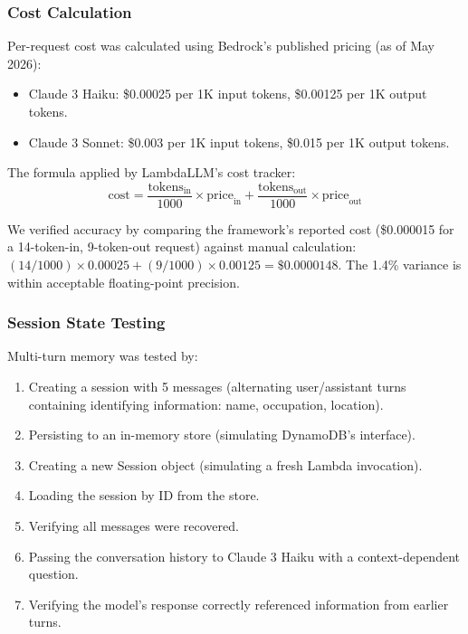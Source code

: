 \documentclass[10pt,twocolumn,letterpaper]{article}
\begin{document}
\subsubsection{Cost Calculation}

Per-request cost was calculated using Bedrock's published pricing (as of May 2026):

\begin{itemize}[leftmargin=*,itemsep=1pt,topsep=2pt]
    \item Claude 3 Haiku: \$0.00025 per 1K input tokens, \$0.00125 per 1K output tokens.
    \item Claude 3 Sonnet: \$0.003 per 1K input tokens, \$0.015 per 1K output tokens.
\end{itemize}

The formula applied by LambdaLLM's cost tracker:
\[
\text{cost} = \frac{\text{tokens}_{\text{in}}}{1000} \times \text{price}_{\text{in}} + \frac{\text{tokens}_{\text{out}}}{1000} \times \text{price}_{\text{out}}
\]

We verified accuracy by comparing the framework's reported cost (\$0.000015 for a 14-token-in, 9-token-out request) against manual calculation: $(14/1000)\times 0.00025 + (9/1000)\times 0.00125 = \$0.0000148$. The 1.4\% variance is within acceptable floating-point precision.

\subsubsection{Session State Testing}

Multi-turn memory was tested by:
\begin{enumerate}[leftmargin=*,itemsep=1pt,topsep=2pt]
    \item Creating a session with 5 messages (alternating user/assistant turns containing identifying information: name, occupation, location).
    \item Persisting to an in-memory store (simulating DynamoDB's interface).
    \item Creating a new Session object (simulating a fresh Lambda invocation).
    \item Loading the session by ID from the store.
    \item Verifying all messages were recovered.
    \item Passing the conversation history to Claude 3 Haiku with a context-dependent question.
    \item Verifying the model's response correctly referenced information from earlier turns.
\end{enumerate}
\end{document}

